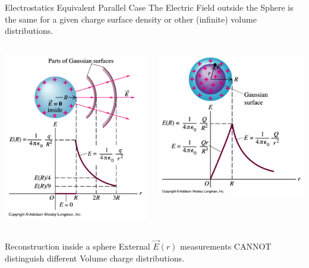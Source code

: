 \documentclass{beamer}
\begin{document}
 \begin{frame}{Electrostatics Equivalent Parallel Case }
 The Electric Field outside the Sphere is the same for a given charge surface  density
or other (infinite) volume  distributions.
 \begin{columns}
	\begin{center}
	\includegraphics[width=.5\columnwidth]{surfcharge.png}
	\end{center}
	\begin{center}
	\includegraphics[width=.5\columnwidth]{volcharge.png}
	\end{center}

\end{columns}

 \begin{block}{Reconstruction inside a sphere }
	External  $\vec{E}(r)$ measurements  CANNOT distinguish different Volume charge distributions.
\end{block}
\end{frame}
\end{document}
